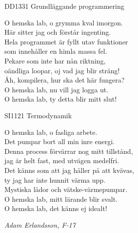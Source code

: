 \documentclass[a6paper,10pt]{article}
\begin{document}
\begin{center}
\footnotesize DD1331 Grundläggande programmering\\
\end{center}
O hemska lab, o grymma kval imorgon. \\
Här sitter jag och förstår ingenting. \\
Hela programmet är fyllt utav funktioner\\
som innehåller en himla massa fel. 
\vspace{5pt} \\
Pekare som inte har nån riktning, \\
oändliga loopar, oj vad jag blir sträng!
\vspace{5pt} \\
Åh, kompilera, hur ska det här fungera? \\
O hemska lab, nu vill jag logga ut. \\
O hemska lab, ty detta blir mitt slut! 

\begin{center}
\footnotesize SI1121 Termodynamik\\
\end{center}
O hemska lab, o fasliga arbete. \\
Det pumpar bort all min inre energi. \\
Denna process förvärrar nog mitt tillstånd, \\
jag är helt fast, med utvägen medelfri. 
\vspace{5pt} \\
Det känns som att jag håller på att kvävas, \\
ty jag har inte hunnit värma upp. 
\vspace{5pt} \\
Mystiska lådor och vätske-värmepumpar. \\
O hemska lab, mitt lärande blir svalt. \\
O hemska lab, det känns ej idealt! 
\begin{flushright}
\textit{Adam Erlandsson, F-17}
\end{flushright}
\end{document}
